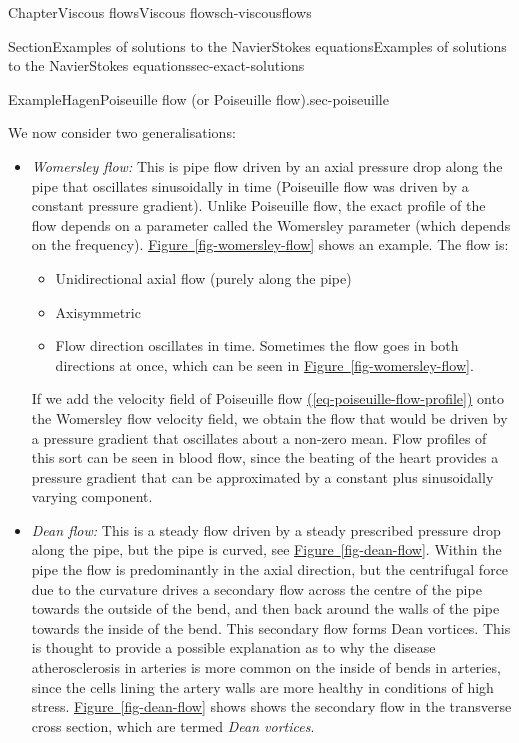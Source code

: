 \documentclass[oneside,10pt,]{book}
\newcommand{\xreffont}{\relax}
\newcommand{\ptxlistdisc}{\raisebox{0.3ex}{\textbullet}}
\newcommand{\ptxlistcircle}{\raisebox{0.3ex}{\textopenbullet}}
\numberwithin{equation}{section}
\begin{document}
\begin{chapterptx}{Chapter}{Viscous flows}{}{Viscous flows}{}{}{ch-viscousflows}
\begin{sectionptx}{Section}{Examples of solutions to the Navier\textendash{}Stokes equations}{}{Examples of solutions to the Navier\textendash{}Stokes equations}{}{}{sec-exact-solutions}
\begin{example}{Example}{Hagen\textendash{}Poiseuille flow (or Poiseuille flow).}{sec-poiseuille}
\par
We now consider two generalisations:%
\begin{itemize}[label=\ptxlistdisc]
\item{}\emph{Womersley flow:} This is pipe flow driven by an axial pressure drop along the pipe that oscillates sinusoidally in time (Poiseuille flow was driven by a constant pressure gradient). Unlike Poiseuille flow, the exact profile of the flow depends on a parameter called the Womersley parameter (which depends on the frequency). \hyperref[fig-womersley-flow]{Figure~{\xreffont\ref{fig-womersley-flow}}} shows an example. The flow is:%
\begin{itemize}[label=\ptxlistcircle]
\item{}Unidirectional axial flow (purely along the pipe)%
\item{}Axisymmetric%
\item{}Flow direction oscillates in time. Sometimes the flow goes in both directions at once, which can be seen in \hyperref[fig-womersley-flow]{Figure~{\xreffont\ref{fig-womersley-flow}}}.%
\end{itemize}
If we add the velocity field of Poiseuille flow \hyperref[eq-poiseuille-flow-profile]{({\xreffont\ref{eq-poiseuille-flow-profile}})} onto the Womersley flow velocity field, we obtain the flow that would be driven by a pressure gradient that oscillates about a non-zero mean. Flow profiles of this sort can be seen in blood flow, since the beating of the heart provides a pressure gradient that can be approximated by a constant plus sinusoidally varying component.%
\item{}\emph{Dean flow:} This is a steady flow driven by a steady prescribed pressure drop along the pipe, but the pipe is curved, see \hyperref[fig-dean-flow]{Figure~{\xreffont\ref{fig-dean-flow}}}. Within the pipe the flow is predominantly in the axial direction, but the centrifugal force due to the curvature drives a secondary flow across the centre of the pipe towards the outside of the bend, and then back around the walls of the pipe towards the inside of the bend. This secondary flow forms Dean vortices. This is thought to provide a possible explanation as to why the disease atherosclerosis in arteries is more common on the inside of bends in arteries, since the cells lining the artery walls are more healthy in conditions of high stress. \hyperref[fig-dean-flow]{Figure~{\xreffont\ref{fig-dean-flow}}} shows shows the secondary flow in the transverse cross section, which are termed \emph{Dean vortices}.%
\end{itemize}

\end{example}
\end{sectionptx}
\end{chapterptx}
\end{document}
